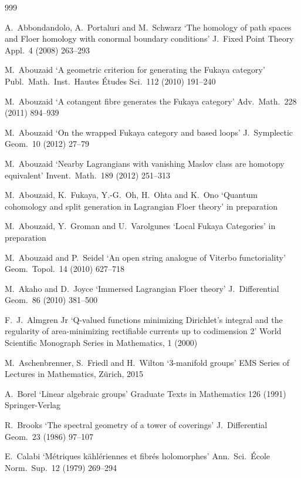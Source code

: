 \documentclass{article}
\theoremstyle{plain}%
\theoremstyle{definition}
\numberwithin{equation}{section}
\numberwithin{figure}{section}
\begin{document}
  
\begin{thebibliography}{999}


A.\ Abbondandolo, A.\ Portaluri and M.\ Schwarz
`The homology of path spaces and Floer homology with conormal boundary conditions'
J.\ Fixed Point Theory Appl.\ 4 (2008) 263--293
 
 M.\ Abouzaid
`A geometric criterion for generating the Fukaya category' Publ.\ Math.\  Inst.\ Hautes \'Etudes Sci.\ 112 (2010) 191--240

 M.\ Abouzaid
`A cotangent fibre generates the Fukaya category' Adv.\ Math.\ 228 (2011) 894--939

 M.\ Abouzaid
`On the wrapped Fukaya category and based loops' J.\ Symplectic Geom.\ 10 (2012) 27--79

 M.\ Abouzaid
`Nearby Lagrangians with vanishing Maslov class are homotopy equivalent' Invent.\ Math.\ 189 (2012) 251--313

 M.\ Abouzaid,  K.\ Fukaya, Y.-G.\ Oh, H.\ Ohta and K.\ Ono `Quantum cohomology and split generation in Lagrangian Floer theory' in preparation

 M.\ Abouzaid, Y.\ Groman and U.\ Varolgunes
`Local Fukaya Categories' in preparation
 
 M.\ Abouzaid and P.\ Seidel
`An open string analogue of Viterbo functoriality'
Geom.\ Topol.\ 14 (2010) 627--718

 M.\ Akaho and D.\ Joyce
`Immersed Lagrangian Floer theory' J.\ Differential Geom.\ 86 (2010) 381--500

 F.\ J.\ Almgren Jr
`Q-valued functions minimizing Dirichlet's integral and the regularity of area-minimizing rectifiable currents up to codimension 2'
World Scientific Monograph Series in Mathematics, 1 (2000)

M.\ Aschenbrenner, S.\ Friedl and H.\ Wilton `3-manifold groups' EMS Series of Lectures in Mathematics, Z\"urich, 2015

 A.\ Borel
`Linear algebraic groups' Graduate Texts in Mathematics 126 (1991) Springer-Verlag

 R.\ Brooks `The spectral geometry of a tower of coverings' J.\ Differential Geom.\ 23 (1986) 97--107

 E.\ Calabi
`M\'etriques k\"ahl\'eriennes et fibr\'es holomorphes'
Ann.\ Sci.\ \'Ecole Norm.\ Sup.\ 12 (1979) 269--294


\end{thebibliography}
\end{document}

